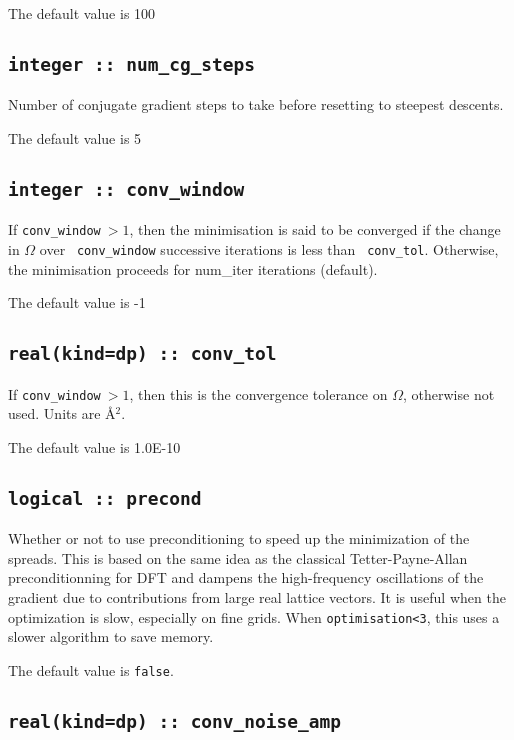 The default value is 100

\subsection[num\_cg\_steps]{\tt integer :: num\_cg\_steps}

Number of conjugate gradient steps to take before resetting to steepest descents.

The default value is 5

\subsection[conv\_window]{\tt integer :: conv\_window}

If {\tt conv\_window}$\:>1$, then the minimisation is said to be
  converged if the change in $\Omega$ over {\tt
  conv\_window} successive iterations is less than {\tt
  conv\_tol}. Otherwise, the minimisation proceeds for
  {num\_iter} iterations (default).

The default value is -1

\subsection[conv\_tol]{\tt real(kind=dp) :: conv\_tol}

If {\tt conv\_window}$\:>1$, then this is the convergence tolerance on
$\Omega$, otherwise not used. Units are \AA$^2$.

The default value is 1.0E-10

\subsection[precond]{\tt logical :: precond}

Whether or not to use preconditioning to speed up the minimization of
the spreads. This is based on the same idea as the classical
Tetter-Payne-Allan preconditionning for DFT and dampens the
high-frequency oscillations of the gradient due to contributions from
large real lattice vectors. It is useful when the optimization is
slow, especially on fine grids. When \verb#optimisation<3#, this uses
a slower algorithm to save memory.

The default value is \verb#false#.

\subsection[conv\_noise\_amp]{\tt real(kind=dp) :: conv\_noise\_amp}

